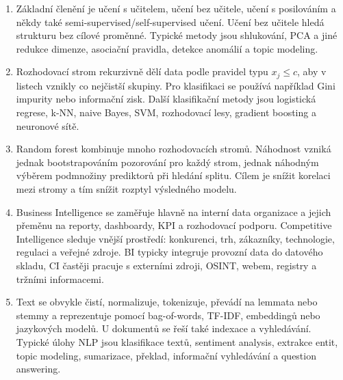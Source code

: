 \documentclass[12pt,a4paper]{article}
\begin{document}
\begin{enumerate}
  \item {}

  Základní členění je učení s učitelem, učení bez učitele, učení s posilováním a někdy také
  semi-supervised/self-supervised učení. Učení bez učitele hledá strukturu bez cílové proměnné.
  Typické metody jsou shlukování, PCA a jiné redukce dimenze, asociační pravidla, detekce anomálií
  a topic modeling.

  \item {}

  Rozhodovací strom rekurzivně dělí data podle pravidel typu \(x_j \le c\), aby v listech vznikly
  co nejčistší skupiny. Pro klasifikaci se používá například Gini impurity nebo informační zisk.
  Další klasifikační metody jsou logistická regrese, k-NN, naive Bayes, SVM, rozhodovací lesy,
  gradient boosting a neuronové sítě.

  \item {}

  Random forest kombinuje mnoho rozhodovacích stromů. Náhodnost vzniká jednak bootstrapováním
  pozorování pro každý strom, jednak náhodným výběrem podmnožiny prediktorů při hledání splitu.
  Cílem je snížit korelaci mezi stromy a tím snížit rozptyl výsledného modelu.

  \item {}

  Business Intelligence se zaměřuje hlavně na interní data organizace a jejich přeměnu na reporty,
  dashboardy, KPI a rozhodovací podporu. Competitive Intelligence sleduje vnější prostředí:
  konkurenci, trh, zákazníky, technologie, regulaci a veřejné zdroje. BI typicky integruje provozní
  data do datového skladu, CI častěji pracuje s externími zdroji, OSINT, webem, registry a tržními
  informacemi.

  \item {}

  Text se obvykle čistí, normalizuje, tokenizuje, převádí na lemmata nebo stemmy a reprezentuje pomocí
  bag-of-words, TF-IDF, embeddingů nebo jazykových modelů. U dokumentů se řeší také indexace a
  vyhledávání. Typické úlohy NLP jsou klasifikace textů, sentiment analysis, extrakce entit,
  topic modeling, sumarizace, překlad, informační vyhledávání a question answering.


\end{enumerate}
\end{document}
